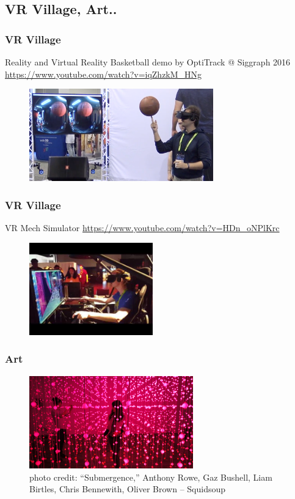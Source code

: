 \subsection{VR Village, Art..}
\frame
{
    \frametitle{VR Village}
  
Reality and Virtual Reality Basketball demo by OptiTrack @ Siggraph 2016
  	\url{https://www.youtube.com/watch?v=iqZhzkM_HNg}
  		  \begin{figure}
  		  	\centering
  		  	\includegraphics[height=4cm]{img/basket.png}
  		  \end{figure}
}
\frame
{
	\frametitle{VR Village}
	
	VR Mech Simulator
	\url{https://www.youtube.com/watch?v=HDn_oNPlKrc}
	  \begin{figure}
	  	\centering
	  	\includegraphics[height=4cm]{img/vrmech.jpg}
	  \end{figure}
	  
}
\frame
{
	\frametitle{Art}
	\begin{figure}
		\centering
		\includegraphics[height=4cm]{img/art.png}
		\caption{photo credit: “Submergence,” Anthony Rowe, Gaz Bushell, Liam Birtles, Chris Bennewith, Oliver Brown – Squidsoup }
	\end{figure}
}

